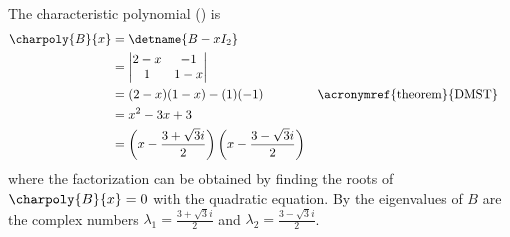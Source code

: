 The characteristic polynomial () is
%
\begin{align*}
\charpoly{B}{x}
&=\detname{B-xI_2}\\
&=
\begin{vmatrix}
2-x & -1\\
1 & 1-x
\end{vmatrix}\\
&=(2-x)(1-x)-(1)(-1)&&\text{\acronymref{theorem}{DMST}}\\
&=x^2-3x+3\\
&=\left(x-\frac{3+\sqrt{3}i}{2}\right)\left(x-\frac{3-\sqrt{3}i}{2}\right)
\end{align*}
%
where the factorization can be obtained by finding the roots of $\charpoly{B}{x}=0$ with the quadratic equation.  By  the eigenvalues of $B$ are the complex numbers $\lambda_1=\frac{3+\sqrt{3}i}{2}$ and $\lambda_2=\frac{3-\sqrt{3}i}{2}$.